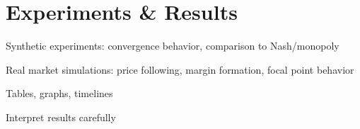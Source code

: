 \section{Experiments \& Results}

Synthetic experiments: convergence behavior, comparison to Nash/monopoly

Real market simulations: price following, margin formation, focal point behavior

Tables, graphs, timelines

Interpret results carefully